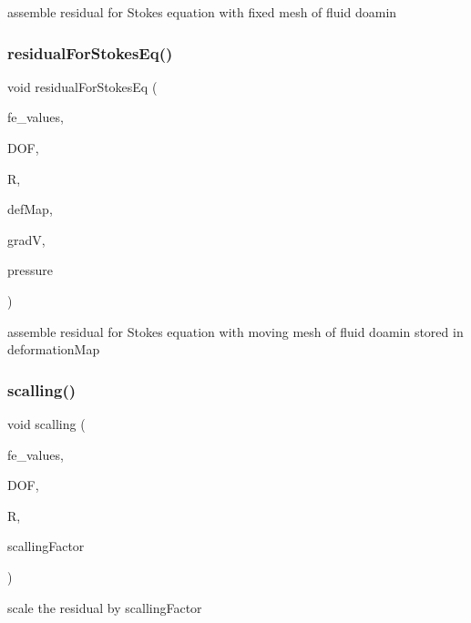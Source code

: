 assemble residual for Stokes equation with fixed mesh of fluid doamin \mbox{\label{class_residual_a95ad863ab9066d2dbfef9db3907a911f}} 
\subsubsection{\texorpdfstring{residualForStokesEq()}{residualForStokesEq()}\hspace{0.1cm}{\footnotesize\ttfamily [2/2]}}
{\footnotesize\ttfamily void residual\+For\+Stokes\+Eq (\begin{DoxyParamCaption}\item[{const F\+E\+Values$<$ dim $>$ \&}]{fe\+\_\+values,  }\item[{unsigned int}]{D\+OF,  }\item[{Table$<$ 1, T $>$ \&}]{R,  }\item[{\mbox{\hyperlink{structdeformation_map}{deformation\+Map}}$<$ T, dim $>$ \&}]{def\+Map,  }\item[{Table$<$ 3, T $>$ \&}]{gradV,  }\item[{dealii\+::\+Table$<$ 1, T $>$ \&}]{pressure }\end{DoxyParamCaption})}

assemble residual for Stokes equation with moving mesh of fluid doamin stored in deformation\+Map \mbox{\label{class_residual_a339d8e3f5d146ad54951896c5f1e3d19}} 
\subsubsection{\texorpdfstring{scalling()}{scalling()}}
{\footnotesize\ttfamily void scalling (\begin{DoxyParamCaption}\item[{const F\+E\+Values$<$ dim $>$ \&}]{fe\+\_\+values,  }\item[{unsigned int}]{D\+OF,  }\item[{Table$<$ 1, Sacado\+::\+Fad\+::\+D\+Fad$<$ double $>$ $>$ \&}]{R,  }\item[{double}]{scalling\+Factor }\end{DoxyParamCaption})}

scale the residual by scalling\+Factor \mbox{\label{class_residual_a74a86942f009e483e946ac0a0036bd71}} 
